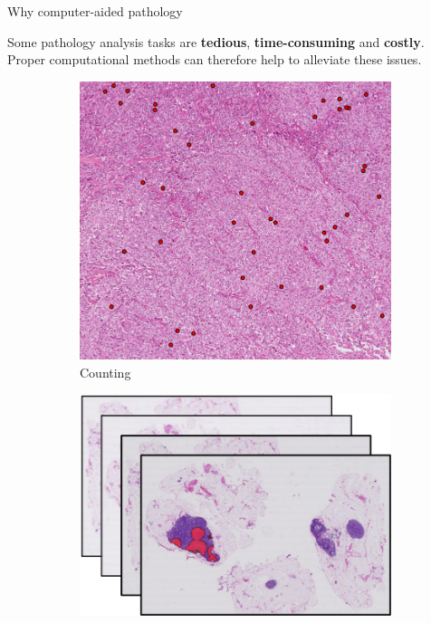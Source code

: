 \documentclass{beamer}
\begin{document}
\begin{frame}{Why computer-aided pathology}

\vfill

Some pathology analysis tasks are \textbf{tedious}, \textbf{time-consuming} and \textbf{costly}. Proper computational methods can therefore help to alleviate these issues.

\vfill

\begin{figure}
	\begin{subfigure}{0.25\textwidth}
		\centering
		\includegraphics[width=\textwidth]{images/mitosis_zoomout.png}
		\caption{Counting}
	\end{subfigure}
	\begin{subfigure}{0.25\textwidth}
		\centering
		\vfill
		\includegraphics[width=\textwidth]{images/highdatavolume.png}

\end{subfigure}
\end{figure}
\end{frame}
\end{document}
